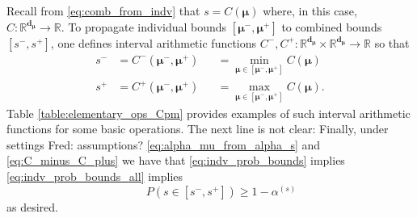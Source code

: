 \documentclass[graybox]{svmult}
\newcommand{\JRComment}[1]{{\color{violet}#1}}
\newcommand{\FJHComment}[1]{{\color{purple}Fred:  #1}}
\begin{document}
Recall from \eqref{eq:comb_from_indv} that $s = C(\boldsymbol{\mu})$ where, in this case, $C: \mathbb{R}^{\boldsymbol{d}_{\boldsymbol{\mu}}} \to \mathbb{R}$. To propagate individual bounds $[\boldsymbol{\mu}^-,\boldsymbol{\mu}^+]$ to combined bounds $[s^-,s^+]$, one defines interval arithmetic \cite{interval_analysis} functions $C^-,C^+: \mathbb{R}^{\boldsymbol{d}_{\boldsymbol{\mu}}} \times \mathbb{R}^{\boldsymbol{d}_{\boldsymbol{\mu}}} \to \mathbb{R}$ so that
\begin{equation}
    \begin{aligned}
    s^- &= C^-(\boldsymbol{\mu}^-,\boldsymbol{\mu}^+) &&= \min_{\boldsymbol{\mu} \in [\boldsymbol{\mu}^-,\boldsymbol{\mu}^+]} C(\boldsymbol{\mu}) \\
    s^+ &= C^+(\boldsymbol{\mu}^-,\boldsymbol{\mu}^+) &&= \max_{\boldsymbol{\mu} \in [\boldsymbol{\mu}^-,\boldsymbol{\mu}^+]} C(\boldsymbol{\mu}).
    \end{aligned}
    \label{eq:C_minus_C_plus}
\end{equation}
Table \ref{table:elementary_ops_Cpm} provides examples of such interval arithmetic functions for some basic operations. \JRComment{The next line is not clear:} Finally, under settings \FJHComment{assumptions?} \eqref{eq:alpha_mu_from_alpha_s} and \eqref{eq:C_minus_C_plus} we have that  \eqref{eq:indv_prob_bounds} implies \eqref{eq:indv_prob_bounds_all} implies
$$\qquad  P(s \in [s^-,s^+]) \geq 1-\alpha^{(s)}$$
as desired.
\end{document}
